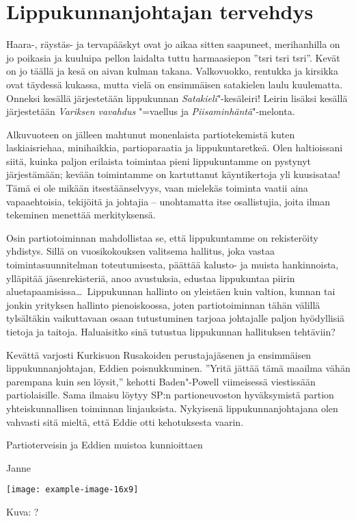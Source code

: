 \section{Lippukunnanjohtajan tervehdys}

\begin{multicols}{2}
\noindent Haara-, räystäs- ja tervapääskyt ovat jo aikaa sitten saapuneet, 
merihanhilla on jo poikasia ja kuuluipa pellon laidalta tuttu harmaasiepon 
''tsri tsri tsri''. Kevät on jo täällä ja kesä on aivan kulman takana. 
Valkovuokko, rentukka ja kirsikka ovat täydessä kukassa, mutta vielä on 
ensimmäisen satakielen laulu kuulematta. Onneksi kesällä järjestetään 
lippukunnan \textit{Satakieli}"-kesäleiri! Leirin lisäksi kesällä 
järjestetään \textit{Variksen vavahdus} "=vaellus ja 
\textit{Piisaminhäntä}"-melonta.

Alkuvuoteen on jälleen mahtunut monenlaista partiotekemistä kuten 
laskiaisriehaa, minihaikkia, partioparaatia ja lippukuntaretkeä. Olen 
haltioissani siitä, kuinka paljon erilaista toimintaa pieni lippukuntamme on 
pystynyt järjestämään; kevään toimintamme on kartuttanut käyntikertoja 
yli kuusisataa! Tämä ei ole mikään itsestäänselvyys, vaan mielekäs 
toiminta vaatii aina vapaaehtoisia, tekijöitä ja johtajia -- unohtamatta itse 
osallistujia, joita ilman tekeminen menettää merkityksensä.  

Osin partiotoiminnan mahdollistaa se, että lippukuntamme on rekisteröity 
yhdistys. Sillä on vuosikokouksen valitsema hallitus, joka vastaa 
toimintasuunnitelman toteutumisesta, päättää kalusto- ja muista 
hankinnoista, ylläpitää jäsenrekisteriä, anoo avustuksia, edustaa 
lippukuntaa piirin aluetapaamisissa\ldots\ Lippukunnan hallinto on yleistäen 
kuin valtion, kunnan tai jonkin yrityksen hallinto pienoiskoossa, joten 
partiotoiminnan tähän välillä tylsältäkin vaikuttavaan osaan tutustuminen 
tarjoaa johtajalle paljon hyödyllisiä tietoja ja taitoja. Haluaisitko sinä 
tutustua lippukunnan hallituksen tehtäviin? 

Kevättä varjosti Kurkisuon Rusakoiden perustajajäsenen ja ensimmäisen 
lippukunnanjohtajan, Eddien poisnukkuminen. ''Yritä jättää tämä maailma 
vähän parempana kuin sen löysit,'' kehotti Baden"-Powell viimeisessä 
viestissään partiolaisille. Sama ilmaisu löytyy SP:n partioneuvoston 
hyväksymistä partion yhteiskunnallisen toiminnan linjauksista. Nykyisenä 
lippukunnanjohtajana olen vahvasti sitä mieltä, että Eddie otti kehotuksesta 
vaarin.

Partioterveisin ja Eddien muistoa kunnioittaen

\noindent\null\hfill Janne

\smallskip

\noindent\texttt{[image: example-image-16x9]}

\smallskip

\noindent\null\hfill Kuva: ?
\end{multicols}
